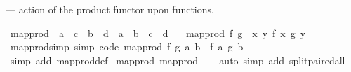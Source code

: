 \begin{isabellebody}
\begin{isamarkuptext}%
 --- action of the product functor upon functions.%
\end{isamarkuptext}\isamarkuptrue%
\isamarkupfalse%
\ map{\isacharunderscore}{\kern0pt}prod\ {\isacharcolon}{\kern0pt}{\isacharcolon}{\kern0pt}\ {\isachardoublequoteopen}{\isacharparenleft}{\kern0pt}{\isacharprime}{\kern0pt}a\ {\isasymRightarrow}\ {\isacharprime}{\kern0pt}c{\isacharparenright}{\kern0pt}\ {\isasymRightarrow}\ {\isacharparenleft}{\kern0pt}{\isacharprime}{\kern0pt}b\ {\isasymRightarrow}\ {\isacharprime}{\kern0pt}d{\isacharparenright}{\kern0pt}\ {\isasymRightarrow}\ {\isacharprime}{\kern0pt}a\ {\isasymtimes}\ {\isacharprime}{\kern0pt}b\ {\isasymRightarrow}\ {\isacharprime}{\kern0pt}c\ {\isasymtimes}\ {\isacharprime}{\kern0pt}d{\isachardoublequoteclose}\isanewline
\ \ \ {\isachardoublequoteopen}map{\isacharunderscore}{\kern0pt}prod\ f\ g\ {\isacharequal}{\kern0pt}\ {\isacharparenleft}{\kern0pt}{\isasymlambda}{\isacharparenleft}{\kern0pt}x{\isacharcomma}{\kern0pt}\ y{\isacharparenright}{\kern0pt}{\isachardot}{\kern0pt}\ {\isacharparenleft}{\kern0pt}f\ x{\isacharcomma}{\kern0pt}\ g\ y{\isacharparenright}{\kern0pt}{\isacharparenright}{\kern0pt}{\isachardoublequoteclose}\isanewline
\isanewline
{}\isamarkupfalse%
\ map{\isacharunderscore}{\kern0pt}prod{\isacharunderscore}{\kern0pt}simp\ {\isacharbrackleft}{\kern0pt}simp{\isacharcomma}{\kern0pt}\ code{\isacharbrackright}{\kern0pt}{\isacharcolon}{\kern0pt}\ {\isachardoublequoteopen}map{\isacharunderscore}{\kern0pt}prod\ f\ g\ {\isacharparenleft}{\kern0pt}a{\isacharcomma}{\kern0pt}\ b{\isacharparenright}{\kern0pt}\ {\isacharequal}{\kern0pt}\ {\isacharparenleft}{\kern0pt}f\ a{\isacharcomma}{\kern0pt}\ g\ b{\isacharparenright}{\kern0pt}{\isachardoublequoteclose}\isanewline
%
\isadelimproof
\ \ %
\endisadelimproof
%
\isatagproof
{}\isamarkupfalse%
\ {\isacharparenleft}{\kern0pt}simp\ add{\isacharcolon}{\kern0pt}\ map{\isacharunderscore}{\kern0pt}prod{\isacharunderscore}{\kern0pt}def{\isacharparenright}{\kern0pt}%
\endisatagproof
{\isafoldproof}%
%
\isadelimproof
\isanewline
%
\endisadelimproof
\isanewline
{}\isamarkupfalse%
\ map{\isacharunderscore}{\kern0pt}prod{\isacharcolon}{\kern0pt}\ map{\isacharunderscore}{\kern0pt}prod\isanewline
%
\isadelimproof
\ \ %
\endisadelimproof
%
\isatagproof
{}\isamarkupfalse%
\ {\isacharparenleft}{\kern0pt}auto\ simp\ add{\isacharcolon}{\kern0pt}\ split{\isacharunderscore}{\kern0pt}paired{\isacharunderscore}{\kern0pt}all{\isacharparenright}{\kern0pt}%

\end{isabellebody}
